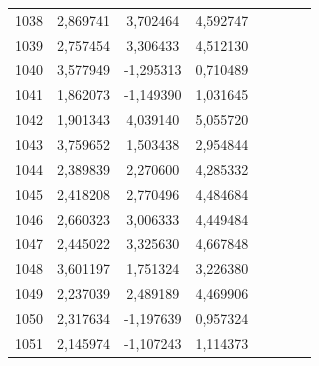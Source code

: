 \begin{apendicesenv}
\begin{table}[H]
\begin{tabular}{c c c c c c c c}
		1038 & 2,869741 & 3,702464 & 4,592747 \\
		1039 & 2,757454 & 3,306433 & 4,512130 \\
		1040 & 3,577949 & -1,295313 & 0,710489 \\
		1041 & 1,862073 & -1,149390 & 1,031645 \\
		1042 & 1,901343 & 4,039140 & 5,055720 \\
		1043 & 3,759652 & 1,503438 & 2,954844 \\
		1044 & 2,389839 & 2,270600 & 4,285332 \\
		1045 & 2,418208 & 2,770496 & 4,484684 \\
		1046 & 2,660323 & 3,006333 & 4,449484 \\
		1047 & 2,445022 & 3,325630 & 4,667848 \\
		1048 & 3,601197 & 1,751324 & 3,226380 \\
		1049 & 2,237039 & 2,489189 & 4,469906 \\
		1050 & 2,317634 & -1,197639 & 0,957324 \\
		1051 & 2,145974 & -1,107243 & 1,114373 \\
		\bottomrule
	\end{tabular}
\end{table}

\pagebreak


\end{apendicesenv}
